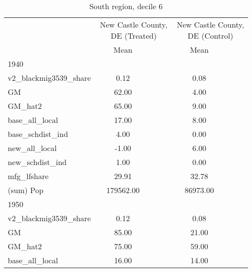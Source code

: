 \begin{table}[htbp]\centering
\def\sym#1{\ifmmode^{#1}\else\(^{#1}\)\fi}
\caption{South region, decile 6 \label{tab1}}
\begin{tabular}{l*{2}{ccc}}
\toprule
                    &\multicolumn{3}{c}{New Castle County, DE (Treated)}&\multicolumn{3}{c}{New Castle County, DE (Control)}\\
                    &        Mean&            &            &        Mean&            &            \\
\midrule
1940                &            &            &            &            &            &            \\
v2\_blackmig3539\_share&        0.12&            &            &        0.08&            &            \\
GM                  &       62.00&            &            &        4.00&            &            \\
GM\_hat2             &       65.00&            &            &        9.00&            &            \\
base\_all\_local      &       17.00&            &            &        8.00&            &            \\
base\_schdist\_ind    &        4.00&            &            &        0.00&            &            \\
new\_all\_local       &       -1.00&            &            &        6.00&            &            \\
new\_schdist\_ind     &        1.00&            &            &        0.00&            &            \\
mfg\_lfshare         &       29.91&            &            &       32.78&            &            \\
(sum) Pop           &   179562.00&            &            &    86973.00&            &            \\
\midrule
1950                &            &            &            &            &            &            \\
v2\_blackmig3539\_share&        0.12&            &            &        0.08&            &            \\
GM                  &       85.00&            &            &       21.00&            &            \\
GM\_hat2             &       75.00&            &            &       59.00&            &            \\
base\_all\_local      &       16.00&            &            &       14.00&            &            \\

\end{tabular}
\end{table}
